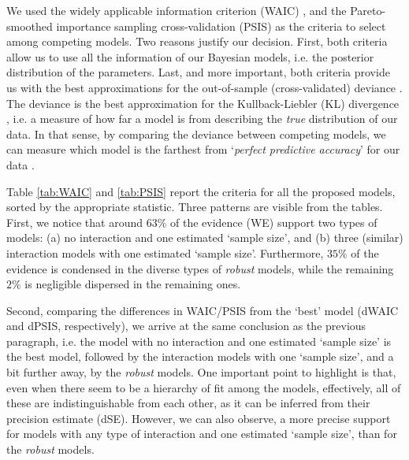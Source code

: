 We used the widely applicable information criterion (WAIC) \citep{Watanabe_2013}, and the Pareto-smoothed importance sampling cross-validation (PSIS) \citep{Vehtari_et_al_2021} as the criteria to select among competing models. Two reasons justify our decision. First, both criteria allow us to use all the information of our Bayesian models, i.e. the posterior distribution of the parameters. Last, and more important, both criteria provide us with the best approximations for the out-of-sample (cross-validated) deviance \citep{McElreath_2020}. The deviance is the best approximation for the Kullback-Liebler (KL) divergence \citep{Kullback_et_al_1951}, i.e. a measure of how far a model is from describing the \textit{true} distribution of our data. In that sense, by comparing the deviance between competing models, we can measure which model is the farthest from `\textit{perfect predictive accuracy}' for our data \cite{McElreath_2020}.

Table \ref{tab:WAIC} and \ref{tab:PSIS} report the criteria for all the proposed models, sorted by the appropriate statistic. Three patterns are visible from the tables. First, we notice that around $63\%$ of the evidence (WE) support two types of models: (a) no interaction and one estimated `sample size', and (b) three (similar) interaction models with one estimated `sample size'. Furthermore, $35\%$ of the evidence is condensed in the diverse types of \textit{robust} models, while the remaining $2\%$ is negligible dispersed in the remaining ones.

Second, comparing the differences in WAIC/PSIS from the `best' model (dWAIC and dPSIS, respectively), we arrive at the same conclusion as the previous paragraph, i.e. the model with no interaction and one estimated `sample size' is the best model, followed by the interaction models with one `sample size', and a bit further away, by the \textit{robust} models. One important point to highlight is that, even when there seem to be a hierarchy of fit among the models, effectively, all of these are indistinguishable from each other, as it can be inferred from their precision estimate (dSE). However, we can also observe, a more precise support for models with any type of interaction and one estimated `sample size', than for the \textit{robust} models.

